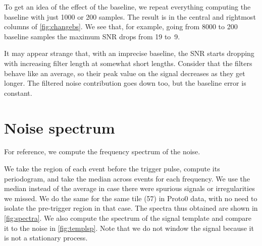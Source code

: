 To get an idea of the effect of the baseline, we repeat everything computing
the baseline with just 1000 or 200 samples. The result is in the central and
rightmost columns of \autoref{fig:changebs}. We see that, for example, going
from 8000 to 200 baseline samples the maximum SNR drops from 19 to~9.

It may appear strange that, with an imprecise baseline, the SNR starts dropping
with increasing filter length at somewhat short lengths. Consider that the
filters behave like an average, so their peak value on the signal decreases as
they get longer. The filtered noise contribution goes down too, but the
baseline error is constant.

\begin{figure}[t]
    
    

\end{figure}

\section{Noise spectrum}
\label{sec:spectrum}

For reference, we compute the frequency spectrum of the noise.

We take the region of each event before the trigger pulse, compute its
periodogram, and take the median across events for each frequency. We use the
median instead of the average in case there were spurious signals or
irregularities we missed. We do the same for the same tile (57) in Proto0 data,
with no need to isolate the pre-trigger region in that case. The spectra thus
obtained are shown in \autoref{fig:spectra}. We also compute the spectrum of
the signal template and compare it to the noise in \autoref{fig:templsp}. Note
that we do not window the signal because it is not a stationary process.

